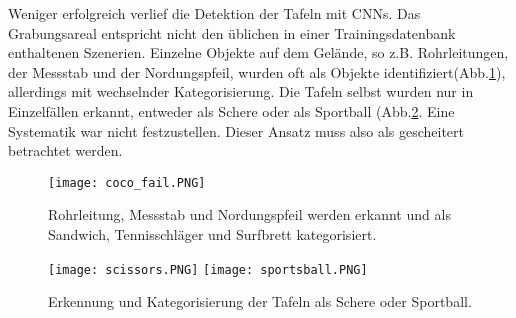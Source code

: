 Weniger erfolgreich verlief die Detektion der Tafeln mit CNNs. Das Grabungsareal entspricht nicht den üblichen in einer Trainingsdatenbank enthaltenen Szenerien. Einzelne Objekte auf dem Gelände, so z.B. Rohrleitungen, der Messstab und der Nordungspfeil, wurden oft als Objekte identifiziert(Abb.\ref{fig:coco}), allerdings mit wechselnder Kategorisierung. Die Tafeln selbst wurden nur in Einzelfällen erkannt, entweder als Schere oder als Sportball (Abb.\ref{fig:cnnboard}. Eine Systematik war nicht festzustellen. Dieser Ansatz muss also als gescheitert betrachtet werden.

\begin{figure}[h!]
\centering
\texttt{[image: coco\_fail.PNG]}
\caption{Rohrleitung, Messstab und Nordungspfeil werden erkannt und als Sandwich, Tennisschläger und Surfbrett kategorisiert.}
\label{fig:coco}
\end{figure}
\begin{figure}[h!]
\texttt{[image: scissors.PNG]}
\texttt{[image: sportsball.PNG]}
\caption{Erkennung und Kategorisierung der Tafeln als Schere oder Sportball.}
\label{fig:cnnboard}
\end{figure}



